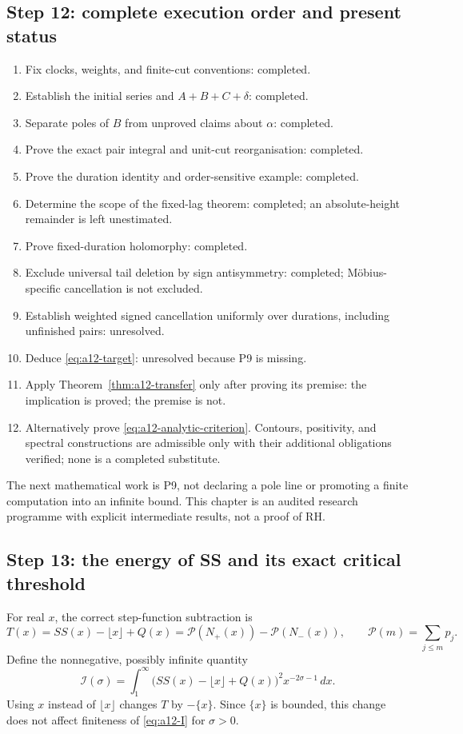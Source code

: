 \documentclass[11pt]{amsart}
\numberwithin{equation}{section}
\theoremstyle{plain}
\theoremstyle{definition}
\theoremstyle{remark}
\begin{document}
\subsection{Step 12: complete execution order and present status}
\label{subsec:a12-execution}
\begin{enumerate}[label=\textup{P\arabic*.},leftmargin=*]
\item Fix clocks, weights, and finite-cut conventions: completed.
\item Establish the initial series and $A+B+C+\delta$: completed.
\item Separate poles of $B$ from unproved claims about $\alpha$: completed.
\item Prove the exact pair integral and unit-cut reorganisation: completed.
\item Prove the duration identity and order-sensitive example: completed.
\item Determine the scope of the fixed-lag theorem: completed; an
absolute-height remainder is left unestimated.
\item Prove fixed-duration holomorphy: completed.
\item Exclude universal tail deletion by sign antisymmetry: completed;
M\"obius-specific cancellation is not excluded.
\item Establish weighted signed cancellation uniformly over durations,
including unfinished pairs: unresolved.
\item Deduce \eqref{eq:a12-target}: unresolved because P9 is missing.
\item Apply Theorem~\ref{thm:a12-transfer} only after proving its premise:
the implication is proved; the premise is not.
\item Alternatively prove \eqref{eq:a12-analytic-criterion}. Contours,
positivity, and spectral constructions are admissible only with their
additional obligations verified; none is a completed substitute.
\end{enumerate}

The next mathematical work is P9, not declaring a pole line or promoting a
finite computation into an infinite bound. This chapter is an audited
research programme with explicit intermediate results, not a proof of RH.

\subsection{Step 13: the energy of SS and its exact critical threshold}
\label{subsec:a12-SS-energy}
For real $x$, the correct step-function subtraction is
\begin{equation}
\label{eq:a12-T-real}
T(x)=SS(x)-\lfloor x\rfloor+Q(x)
=\mathcal P(N_+(x))-\mathcal P(N_-(x)),\qquad
\mathcal P(m)=\sum_{j\le m}p_j.
\end{equation}
Define the nonnegative, possibly infinite quantity
\begin{equation}
\label{eq:a12-I}
\boxed{\mathcal I(\sigma)=\int_1^\infty
\bigl(SS(x)-\lfloor x\rfloor+Q(x)\bigr)^2x^{-2\sigma-1}\,dx.}
\end{equation}
Using $x$ instead of $\lfloor x\rfloor$ changes $T$ by $-\{x\}$.
Since $\{x\}$ is bounded, this change does not affect finiteness of
\eqref{eq:a12-I} for $\sigma>0$.
\end{document}
